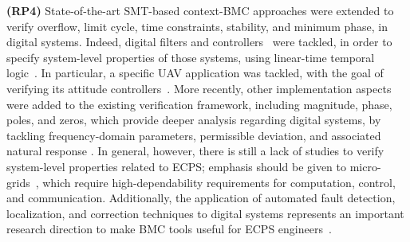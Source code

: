 \documentclass[format=acmsmall, review=false, screen=true]{acmart}
\begin{document}
\textbf{(RP4)} State-of-the-art SMT-based context-BMC approaches were extended to verify overflow, limit cycle, time constraints, stability, and minimum phase, in digital systems. Indeed, digital filters and controllers~\cite{dsv_spin2015,esbmc_controller,esbmc_filter} were tackled, in order to specify system-level properties of those systems, using linear-time temporal logic~\cite{JMorse15}. In particular, a specific UAV application was tackled, with the goal of verifying its attitude controllers~\cite{Bessa16,Chaves17}. More recently, other implementation aspects were added to the existing verification framework, including magnitude, phase, poles, and zeros, which provide deeper analysis regarding digital systems, by tackling frequency-domain parameters, permissible deviation, and associated natural response \cite{sbrtdaniel}. In general, however, there is still a lack of studies to verify system-level properties related to ECPS; emphasis should be given to micro-grids~\cite{xu15}, which require high-dependability requirements for computation, control, and communication. Additionally, the application of automated fault detection, localization, and correction techniques to digital systems represents an important research direction to make BMC tools useful for ECPS engineers~\cite{Alves15}.
\end{document}
